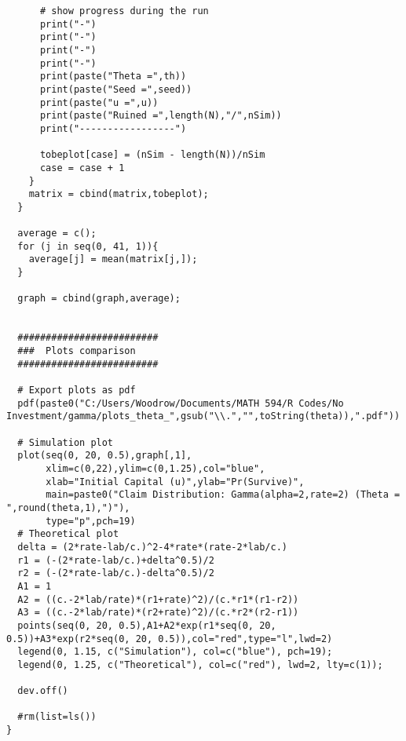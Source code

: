 \documentclass[12pt]{article}
\begin{document}
\begin{lstlisting}
      # show progress during the run
      print("-")
      print("-")
      print("-")
      print("-")
      print(paste("Theta =",th))
      print(paste("Seed =",seed))
      print(paste("u =",u))
      print(paste("Ruined =",length(N),"/",nSim))
      print("-----------------")
      
      tobeplot[case] = (nSim - length(N))/nSim
      case = case + 1
    }
    matrix = cbind(matrix,tobeplot);
  }
  
  average = c();
  for (j in seq(0, 41, 1)){
    average[j] = mean(matrix[j,]);
  }
  
  graph = cbind(graph,average);
  
  
  #########################
  ###  Plots comparison
  #########################
  
  # Export plots as pdf
  pdf(paste0("C:/Users/Woodrow/Documents/MATH 594/R Codes/No Investment/gamma/plots_theta_",gsub("\\.","",toString(theta)),".pdf"))
  
  # Simulation plot
  plot(seq(0, 20, 0.5),graph[,1],
       xlim=c(0,22),ylim=c(0,1.25),col="blue",
       xlab="Initial Capital (u)",ylab="Pr(Survive)",
       main=paste0("Claim Distribution: Gamma(alpha=2,rate=2) (Theta = ",round(theta,1),")"),
       type="p",pch=19)
  # Theoretical plot
  delta = (2*rate-lab/c.)^2-4*rate*(rate-2*lab/c.)
  r1 = (-(2*rate-lab/c.)+delta^0.5)/2
  r2 = (-(2*rate-lab/c.)-delta^0.5)/2
  A1 = 1
  A2 = ((c.-2*lab/rate)*(r1+rate)^2)/(c.*r1*(r1-r2))
  A3 = ((c.-2*lab/rate)*(r2+rate)^2)/(c.*r2*(r2-r1))
  points(seq(0, 20, 0.5),A1+A2*exp(r1*seq(0, 20, 0.5))+A3*exp(r2*seq(0, 20, 0.5)),col="red",type="l",lwd=2)
  legend(0, 1.15, c("Simulation"), col=c("blue"), pch=19);
  legend(0, 1.25, c("Theoretical"), col=c("red"), lwd=2, lty=c(1));
  
  dev.off()
  
  #rm(list=ls())
}
\end{lstlisting}
\end{document}
